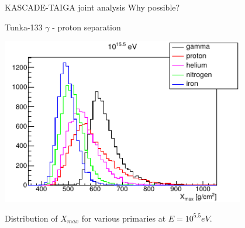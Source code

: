 
%

\begin{frame}{KASCADE-TAIGA joint analysis}
 Why possible?
\end{frame}

\begin{frame}{Tunka-133 $\gamma$ - proton separation}
    \begin{center}
	\includegraphics[width=0.8\textwidth]{pics/tunka_gamma_cr_diff.pdf}
	
      Distribution of $X_{max}$ for various primaries at $E = 10^{5.5} eV$.
    \end{center}
\end{frame}

